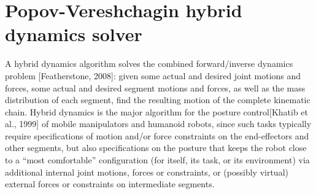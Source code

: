 \chapter{Popov-Vereshchagin hybrid dynamics solver}
A hybrid dynamics algorithm solves the combined forward/inverse dynamics
problem [Featherstone, 2008]: given some actual and desired joint motions and forces, some actual and desired segment motions and forces, as well as the mass distribution of each segment, find the resulting motion of the complete kinematic chain. Hybrid dynamics is the major algorithm for the posture control[Khatib et al., 1999] of mobile manipulators and humanoid robots, since such tasks typically require specifications of motion and/or force constraints on the end-effectors and other segments, but also specifications on the posture that keeps the robot close to a “most comfortable” configuration (for itself, its task, or its environment) via additional internal joint motions, forces or constraints, or (possibly virtual) external forces or constraints on intermediate segments.